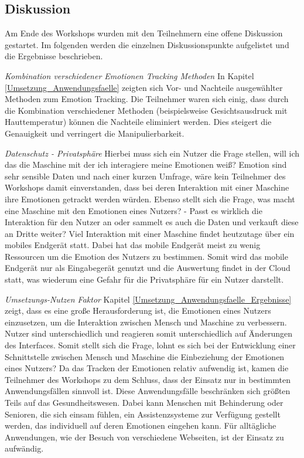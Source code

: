 \subsection{Diskussion}
Am Ende des Workshops wurden mit den Teilnehmern eine offene Diskussion gestartet. Im folgenden werden die einzelnen Diskussionspunkte aufgelistet und die Ergebnisse beschrieben.
\vspace{2mm}

\textit{Kombination verschiedener Emotionen Tracking Methoden} 
\newline
In Kapitel \ref{Umsetzung_Anwendungsfaelle} zeigten sich Vor- und Nachteile ausgewählter Methoden zum Emotion Tracking. Die Teilnehmer waren sich einig, dass durch die Kombination verschiedener Methoden (beispielsweise Gesichtsausdruck mit Hauttemperatur) können die Nachteile eliminiert werden. Dies steigert die Genauigkeit und verringert die Manipulierbarkeit.
\vspace{2mm}

\textit{Datenschutz - Privatsphäre} \newline
Hierbei muss sich ein Nutzer die Frage stellen, will ich das die Maschine mit der ich interagiere meine Emotionen weiß? Emotion sind sehr sensible Daten und nach einer kurzen Umfrage, wäre kein Teilnehmer des Workshops damit einverstanden, dass bei deren Interaktion mit einer Maschine ihre Emotionen getrackt werden würden. Ebenso stellt sich die Frage, was macht eine Maschine mit den Emotionen eines Nutzers? - Passt es wirklich die Interaktion für den Nutzer an oder sammelt es auch die Daten und verkauft diese an Dritte weiter? Viel Interaktion mit einer Maschine findet heutzutage über ein mobiles Endgerät statt. Dabei hat das mobile Endgerät meist zu wenig Ressourcen um die Emotion des Nutzers zu bestimmen. Somit wird das mobile Endgerät nur als Eingabegerät genutzt und die Auswertung findet in der Cloud statt, was wiederum eine Gefahr für die Privatsphäre für ein Nutzer darstellt.
\vspace{2mm}

\textit{Umsetzungs-Nutzen Faktor}\newline
Kapitel \ref{Umsetzung_Anwendungsfaelle_Ergebnisse} zeigt, dass es eine große Herausforderung ist, die Emotionen eines Nutzers einzusetzen, um die Interaktion zwischen Mensch und Maschine zu verbessern. Nutzer sind unterschiedlich und reagieren somit unterschiedlich auf Änderungen des Interfaces. Somit stellt sich die Frage, lohnt es sich bei der Entwicklung einer Schnittstelle zwischen Mensch und Maschine die Einbeziehung der Emotionen eines Nutzers? Da das Tracken der Emotionen relativ aufwendig ist, kamen die Teilnehmer des Workshops zu dem Schluss, dass der Einsatz nur in bestimmten Anwendungsfällen sinnvoll ist. Diese Anwendungsfälle beschränken sich größten Teils auf das Gesundheitswesen. Dabei kann Menschen mit Behinderung oder Senioren, die sich einsam fühlen, ein Assistenzsysteme zur Verfügung gestellt werden, das individuell auf deren Emotionen eingehen kann. Für alltägliche Anwendungen, wie der Besuch von verschiedene Webseiten, ist der Einsatz zu aufwändig.

